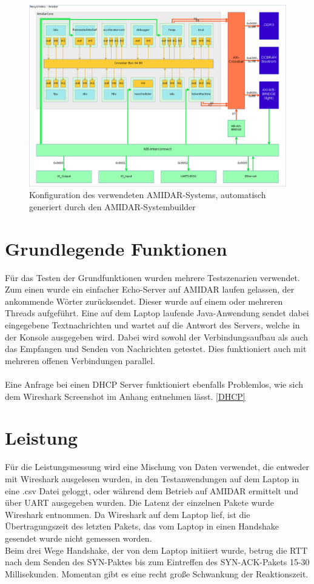 \begin{figure}
	\centering
	\includegraphics[width = 1\textwidth]{Graphics/system.png}
	\caption{Konfiguration des verwendeten AMIDAR-Systems, automatisch generiert durch den AMIDAR-Systembuilder}

\end{figure}

\FloatBarrier
\section{Grundlegende Funktionen}

Für das Testen der Grundfunktionen wurden mehrere Testszenarien verwendet. Zum einen wurde ein einfacher Echo-Server auf AMIDAR laufen gelassen, der ankommende Wörter zurücksendet. Dieser wurde auf einem oder mehreren Threads aufgeführt. Eine auf dem Laptop laufende Java-Anwendung sendet dabei eingegebene Textnachrichten und wartet auf die Antwort des Servers, welche in der Konsole ausgegeben wird. Dabei wird sowohl der Verbindungsaufbau als auch das Empfangen und Senden von Nachrichten getestet. Dies funktioniert auch mit mehreren offenen Verbindungen parallel. \\\\
Eine Anfrage bei einen DHCP Server funktioniert ebenfalls Problemlos, wie sich dem Wireshark Screenshot im Anhang entnehmen lässt. \autoref{DHCP}




\section{Leistung}
Für die Leistungsmessung wird eine Mischung von Daten verwendet, die entweder mit Wireshark ausgelesen wurden, in den Testanwendungen auf dem Laptop in eine .csv Datei geloggt, oder während dem Betrieb auf AMIDAR ermittelt und über UART ausgegeben wurden. 
Die Latenz der einzelnen Pakete wurde Wireshark entnommen. Da Wireshark auf dem Laptop lief, ist die Übertragungszeit des letzten Pakets, das vom Laptop in einen Handshake gesendet wurde nicht gemessen worden. \\
Beim drei Wege Handshake, der von dem Laptop initiiert wurde, betrug die RTT nach dem Senden des SYN-Paktes bis zum Eintreffen des SYN-ACK-Pakets 15-30 Millisekunden. Momentan gibt es eine recht große Schwankung der Reaktionszeit. 

